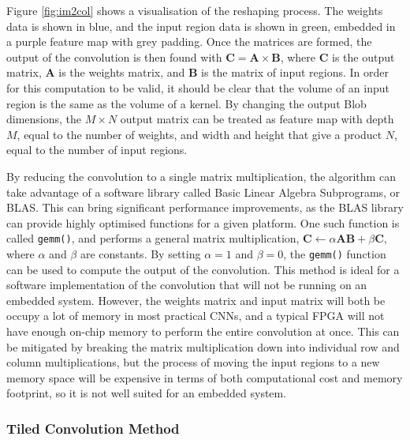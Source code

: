 \documentclass[12pt]{article}
\begin{document}
Figure \ref{fig:im2col} shows a visualisation of the reshaping process. The weights data is shown in blue, and the input region data is shown in green, embedded in a purple feature map with grey padding. Once the matrices are formed, the output of the convolution is then found with \( \mathbf{C} = \mathbf{A}\times\mathbf{B}\), where $\mathbf{C}$ is the output matrix, $\mathbf{A}$ is the weights matrix, and $\mathbf{B}$ is the matrix of input regions. In order for this computation to be valid, it should be clear that the volume of an input region is the same as the volume of a kernel. By changing the output Blob dimensions, the $M \times N$ output matrix can be treated as feature map with depth $M$, equal to the number of weights, and width and height that give a product $N$, equal to the number of input regions.

By reducing the convolution to a single matrix multiplication, the algorithm can take advantage of a software library called Basic Linear Algebra Subprograms, or BLAS. This can bring significant performance improvements, as the BLAS library can provide highly optimised functions for a given platform. One such function is called \lstinline|gemm()|, and performs a general matrix multiplication, $\mathbf{C} \gets \alpha\mathbf{A}\mathbf{B} + \beta\mathbf{C}$, where $\alpha$ and $\beta$ are constants. By setting $\alpha = 1$ and $\beta = 0$, the \lstinline|gemm()| function can be used to compute the output of the convolution. This method is ideal for a software implementation of the convolution that will not be running on an embedded system. However, the weights matrix and input matrix will both be occupy a lot of memory in most practical CNNs, and a typical FPGA will not have enough on-chip memory to perform the entire convolution at once. This can be mitigated by breaking the matrix multiplication down into individual row and column multiplications, but the process of moving the input regions to a new memory space will be expensive in terms of both computational cost and memory footprint, so it is not well suited for an embedded system.

\subsubsection{Tiled Convolution Method}
\label{sec:Design-Conv-TC}
\end{document}
